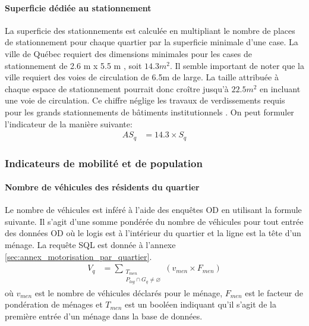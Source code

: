             \paragraph{Superficie dédiée au stationnement} La superficie des stationnements est calculée en multipliant le nombre de places de stationnement pour chaque quartier par la superficie minimale d'une case. La ville de Québec requiert des dimensions minimales pour les cases de stationnement de 2.6 m x 5.5 m \parencite{ville_de_quebec_normes_2024,ville_de_quebec_normes_2024-1,ville_de_quebec_normes_2024-2,ville_de_quebec_normes_2025,ville_de_quebec_rvq_2009}, soit $14.3m^2$. Il semble important de noter que la ville requiert des voies de circulation de 6.5m de large. La taille attribuée à chaque espace de stationnement pourrait donc croître jusqu'à $22.5m^2$ en incluant une voie de circulation.  Ce chiffre néglige les travaux de verdissements requis pour les grands stationnements de bâtiments institutionnels \parencite{ville_de_quebec_normes_2024}. On peut formuler l'indicateur de la manière suivante:
            \begin{align}
                AS_q &= 14.3 \times S_q
            \end{align}
        \subsubsection{Indicateurs de mobilité et de population}
            \paragraph{Nombre de véhicules des résidents du quartier}\label{par:n_vehicules_quartiers} Le nombre de véhicules est inféré à l'aide des enquêtes OD en utilisant la formule suivante. Il s'agit d'une somme pondérée du nombre de véhicules pour tout entrée des données OD où le logis est à l'intérieur du quartier et la ligne est la tête d'un ménage. La requête SQL est donnée à l'annexe \ref{sec:annex_motorisation_par_quartier}.
            \begin{align}
                V_{q} &= \sum_{\substack{T_{men}  \\ P_{log}\cap G_q\neq\varnothing}}{\left(v_{men} \times F_{men}\right)}  \label{eq:nb-voit}
            \end{align}
            où $v_{men}$ est le nombre de véhicules déclarés pour le ménage, $F_{men}$ est le facteur de pondération de ménages et $T_{men}$ est un booléen indiquant qu'il s'agit de la première entrée d'un ménage dans la base de données.
